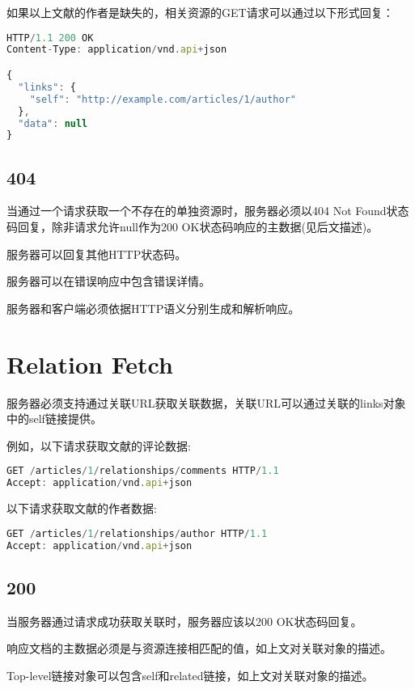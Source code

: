 如果以上文献的作者是缺失的，相关资源的GET请求可以通过以下形式回复：


\begin{lstlisting}[language=JavaScript]
HTTP/1.1 200 OK
Content-Type: application/vnd.api+json

{
  "links": {
    "self": "http://example.com/articles/1/author"
  },
  "data": null
}
\end{lstlisting}

\subsection{404}


当通过一个请求获取一个不存在的单独资源时，服务器必须以404 Not Found状态码回复，除非请求允许null作为200 OK状态码响应的主数据(见后文描述)。

服务器可以回复其他HTTP状态码。

服务器可以在错误响应中包含错误详情。

服务器和客户端必须依据HTTP语义分别生成和解析响应。

\section{Relation Fetch}

服务器必须支持通过关联URL获取关联数据，关联URL可以通过关联的links对象中的self链接提供。

例如，以下请求获取文献的评论数据:

\begin{lstlisting}[language=JavaScript]
GET /articles/1/relationships/comments HTTP/1.1
Accept: application/vnd.api+json
\end{lstlisting}


以下请求获取文献的作者数据:

\begin{lstlisting}[language=JavaScript]
GET /articles/1/relationships/author HTTP/1.1
Accept: application/vnd.api+json
\end{lstlisting}

\subsection{200}


当服务器通过请求成功获取关联时，服务器应该以200 OK状态码回复。

响应文档的主数据必须是与资源连接相匹配的值，如上文对关联对象的描述。

Top-level链接对象可以包含self和related链接，如上文对关联对象的描述。


